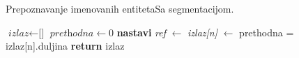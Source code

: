 \documentclass{beamer}
\begin{document}
\begin{frame}{Prepoznavanje imenovanih entiteta}{Sa segmentacijom.}
  \begin{algorithm}[H]
  \begin{algorithmic}[1]
  \State $\textit{izlaz} \gets \text{[]}$
  \State $\textit{prethodna} \gets 0$
      \State \textbf{nastavi} 
    \EndIf
    \State \textit{ref} $\gets$ 
    \State \textit{izlaz[n]} $\gets$ 
    \State prethodna = izlaz[n].duljina
  \EndFor
  \State {}
  \State \textbf{return} izlaz
  \EndFunction
  \end{algorithmic}
  \end{algorithm}
\end{frame}
\end{document}
